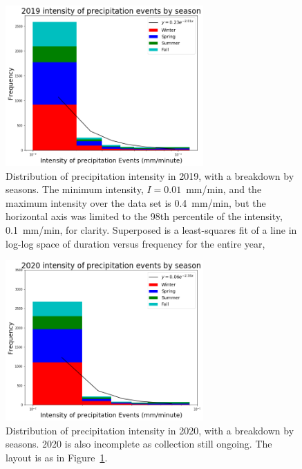 \documentclass[11pt]{report}
\begin{document}
\clearpage
\begin{figure}[t]
\centering
\includegraphics[width=0.675\textwidth]{Figures/inten2019.png}
\caption[Intensity histogram for 2019 broken down by season]
        {\label{i2019}Distribution of precipitation intensity in
          2019, with a breakdown by seasons. The minimum intensity,
          $I=0.01$~mm/min, and the maximum intensity over the data set
          is 0.4~mm/min, but the horizontal axis was limited to the
          98th percentile of the intensity, 0.1~mm/min, for
          clarity. Superposed is a least-squares fit of a line in
          log-log space of duration versus frequency for the entire
          year, %
      }
\end{figure}
\begin{figure}[b]
\centering
\includegraphics[width=0.675\textwidth]{Figures/inten2020.png}
\caption[Intensity histogram for 2020 broken down by season]
        {\label{i2020}Distribution of precipitation intensity in
          2020, with a breakdown by seasons. 2020 is also incomplete
          as collection still ongoing. The layout is as in
          Figure~\ref{i2019}.}
\end{figure}
\end{document}
